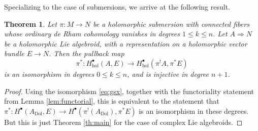 \documentclass[11pt]{amsart}
\newtheorem{theorem}{Theorem}[section]
\theoremstyle{definition}
\theoremstyle{remark}
\newcommand{\Ra}{\Rightarrow}
\newcommand{\on}{\operatorname}
\begin{document}
Specializing to the case of submersions, we arrive at the following result. 

\begin{theorem}
Let $\pi\colon M\to N$ be a holomorphic submersion with connected
fibers whose ordinary de Rham cohomology vanishes in degrees
$1\leq k\leq n$.
Let $A\Ra N$ be a holomorphic Lie algebroid, with a representation on a holomorphic vector bundle $E\to N$. Then 
the pullback map 
\[ \pi^*\colon H^\bullet_{\mathrm{hol}}(A,E)\to H^\bullet_{\mathrm{hol}}(\pi^!A,\pi^*E)\]
is an isomorphism in degrees $0\le k\le n$, and is injective in degree $n+1$. 
\end{theorem}

\begin{proof}
Using the isomorphism \eqref{eq:gsx}, together with the functoriality statement from Lemma \ref{lem:functorial}, this 
is equivalent to the statement that $\pi^*\colon H^\bullet(A_{\on{Dol}},E)\to  H^\bullet(\pi^!(A_{\on{Dol}}),\pi^*E)$ 
is an isomorphism in these degrees. But this is just Theorem \ref{th:main} for the case of complex Lie algebroids. 
\end{proof}


%
%
\end{document}
